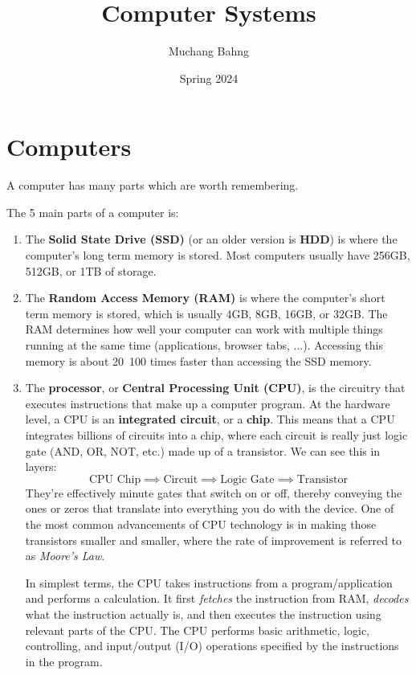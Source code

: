 \documentclass{article}
\begin{document}
\title{Computer Systems}
\author{Muchang Bahng}
\date{Spring 2024}

\maketitle
\tableofcontents
\pagebreak



\section{Computers}

  A computer has many parts which are worth remembering. 

  \begin{definition}
  The 5 main parts of a computer is: 
  \begin{enumerate}
      \item The \textbf{Solid State Drive (SSD)} (or an older version is \textbf{HDD}) is where the computer's long term memory is stored. Most computers usually have 256GB, 512GB, or 1TB of storage. 
      
      \item The \textbf{Random Access Memory (RAM)} is where the computer's short term memory is stored, which is usually 4GB, 8GB, 16GB, or 32GB. The RAM determines how well your computer can work with multiple things running at the same time (applications, browser tabs, ...). Accessing this memory is about 20~100 times faster than accessing the SSD memory. 
      
      \item The \textbf{processor}, or \textbf{Central Processing Unit (CPU)}, is the circuitry that executes instructions that make up a computer program. At the hardware level, a CPU is an \textbf{integrated circuit}, or a \textbf{chip}. This means that a CPU integrates billions of circuits into a chip, where each circuit is really just logic gate (AND, OR, NOT, etc.) made up of a transistor. We can see this in layers: 
      \[\text{CPU Chip} \implies \text{Circuit} \implies \text{Logic Gate} \implies \text{Transistor}\]
      They’re effectively minute gates that switch on or off, thereby conveying the ones or zeros that translate into everything you do with the device. One of the most common advancements of CPU technology is in making those transistors smaller and smaller, where the rate of improvement is referred to as \textit{Moore's Law}. 
      
      In simplest terms, the CPU takes instructions from a program/application and performs a calculation. It first \textit{fetches} the instruction from RAM, \textit{decodes} what the instruction actually is, and then executes the instruction using relevant parts of the CPU. The CPU performs basic arithmetic, logic, controlling, and input/output (I/O) operations specified by the instructions in the program. 
      

\end{enumerate}
\end{definition}
\end{document}
